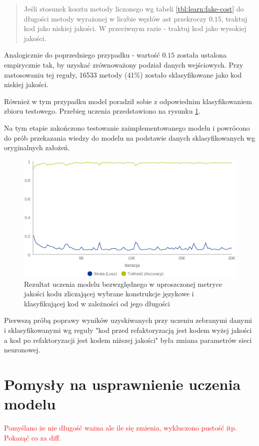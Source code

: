 \documentclass[12pt]{report}
\begin{document}
\begin{quotation}
\noindent Jeśli stosunek kosztu metody liczonego wg tabeli \ref{tbl:learn:fake-cost} do długości metody wyrażonej w liczbie węzłów \gls{ast} przekroczy $0.15$, traktuj kod jako niskiej jakości. W przeciwnym razie - traktuj kod jako wysokiej jakości.
\end{quotation}

Analogicznie do poprzedniego przypadku - wartość $0.15$ została ustalona empirycznie tak, by uzyskać zrównoważony podział danych wejściowych. Przy zastosowaniu tej reguły, 16533 metody (41\%) zostało sklasyfikowane jako kod niskiej jakości.

Również w tym przypadku model poradził sobie z odpowiednim klasyfikowaniem zbioru testowego. Przebieg uczenia przedstawiono na rysunku \ref{fig:learn:fake-static15}. 

Na tym etapie zakończono testowanie zaimplementowanego modelu i powrócono do prób przekazania wiedzy do modelu na podstawie danych sklasyfikowanych wg oryginalnych założeń.

\begin{figure}
\centering
\includegraphics[width=\textwidth]{learn/fake-static-15.eps}
\caption{Rezultat uczenia modelu bezwzględnego w uproszczonej metryce jakości kodu zliczającej wybrane konstrukcje językowe i klasyfikującej kod w zależności od jego długości}
\label{fig:learn:fake-static15}
\end{figure}

Pierwszą próbą poprawy wyników uzyskiwanych przy uczeniu zebranymi danymi i sklasyfikowanymi wg reguły "kod przed refaktoryzacją jest kodem wyżej jakości a kod po refaktoryzacji jest kodem niższej jakości" była zmiana parametrów sieci neuronowej.

\section{Pomysły na usprawnienie uczenia modelu}
\label{sec:learn:better-ideas}
\textcolor{red}{Pomyślano że nie długość ważna ale ile się zmienia, wykluczono pustość itp. Pokaząć co za diff.}
\end{document}

